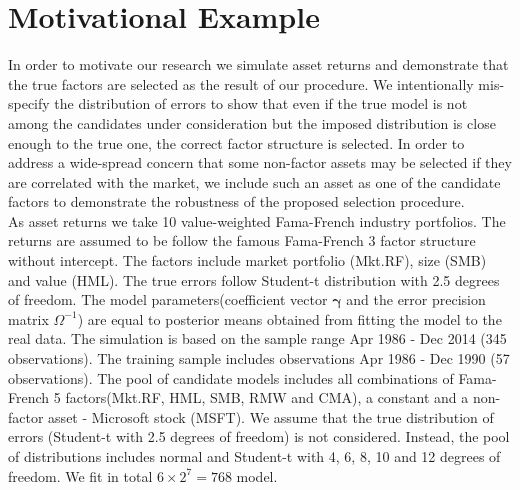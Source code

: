 
\section{Motivational Example}
In order to motivate our research we simulate asset returns and demonstrate that the true factors are selected as the result of our procedure.
We intentionally mis-specify the distribution of errors to show that even if the true model is not among the candidates under consideration but the imposed distribution is close enough to the true one, the correct factor structure is selected. 
In order to address a wide-spread concern that some non-factor assets may be selected if they are correlated with the market, we include such an asset as one of the candidate factors to demonstrate the robustness of the proposed selection procedure.\\
As asset returns we take 10 value-weighted Fama-French industry portfolios. 
The returns are assumed to be follow the famous Fama-French 3 factor structure without intercept. The factors include market portfolio (Mkt.RF), size (SMB) and value (HML). 
The true errors follow Student-t distribution with 2.5 degrees of freedom. 
The model parameters(coefficient vector $\boldsymbol{\gamma}$ and the error precision matrix $\Omega^{-1}$) are equal to posterior means obtained from fitting the model to the real data. 
The simulation is based on the sample range Apr 1986 - Dec 2014 (345 observations). 
The training sample includes observations Apr 1986 - Dec 1990 (57 observations).
The pool of candidate models includes all combinations of Fama-French 5 factors(Mkt.RF, HML, SMB, RMW and CMA), a constant and a non-factor asset - Microsoft stock (MSFT). 
We assume that the true distribution of errors (Student-t with 2.5 degrees of freedom) is not considered. 
Instead, the pool of distributions includes normal and Student-t with 4, 6, 8, 10 and 12 degrees of freedom. 
We fit in total $6\times 2^{7} = 768$ model. 



